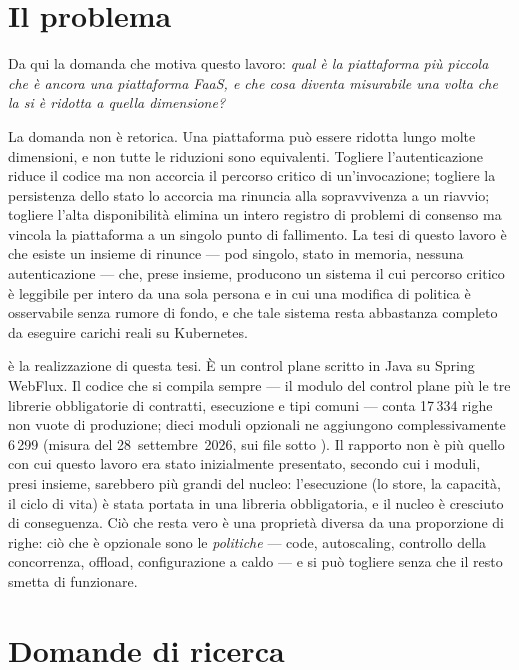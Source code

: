 \section{Il problema}

Da qui la domanda che motiva questo lavoro: \emph{qual \`e la piattaforma pi\`u
piccola che \`e ancora una piattaforma FaaS, e che cosa diventa misurabile una
volta che la si \`e ridotta a quella dimensione?}

La domanda non \`e retorica. Una piattaforma pu\`o essere ridotta lungo molte
dimensioni, e non tutte le riduzioni sono equivalenti. Togliere
l'autenticazione riduce il codice ma non accorcia il percorso critico di
un'invocazione; togliere la persistenza dello stato lo accorcia ma rinuncia alla
sopravvivenza a un riavvio; togliere l'alta disponibilit\`a elimina un intero
registro di problemi di consenso ma vincola la piattaforma a un singolo punto di
fallimento. La tesi di questo lavoro \`e che esiste un insieme di rinunce
--- pod singolo, stato in memoria, nessuna autenticazione --- che, prese
insieme, producono un sistema il cui percorso critico \`e leggibile per intero
da una sola persona e in cui una modifica di politica \`e osservabile senza
rumore di fondo, e che tale sistema resta abbastanza completo da eseguire
carichi reali su Kubernetes.

\nf{} \`e la realizzazione di questa tesi. \`E un control plane scritto in Java
su Spring WebFlux. Il codice che si compila sempre --- il modulo del control
plane pi\`u le tre librerie obbligatorie di contratti, esecuzione e tipi comuni
--- conta 17\,334 righe non vuote di produzione; dieci moduli opzionali ne
aggiungono complessivamente 6\,299 (misura del 28~settembre~2026, sui file
 sotto ). Il rapporto non \`e pi\`u quello con cui
questo lavoro era stato inizialmente presentato, secondo cui i moduli, presi
insieme, sarebbero pi\`u grandi del nucleo: l'esecuzione (lo store, la
capacit\`a, il ciclo di vita) \`e stata portata in una libreria obbligatoria, e
il nucleo \`e cresciuto di conseguenza. Ci\`o che resta vero \`e una
propriet\`a diversa da una proporzione di righe: ci\`o che \`e opzionale sono le
\emph{politiche} --- code, autoscaling, controllo della concorrenza, offload,
configurazione a caldo --- e si pu\`o togliere senza che il resto smetta di
funzionare.

\section{Domande di ricerca}

